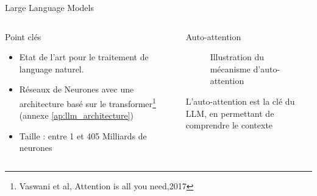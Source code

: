 
\begin{frame}{Large Language Models}
   \begin{columns}
         
       \begin{column}[t]{0.45\textwidth} 
       \begin{block}{Point clés}
           \begin{itemize}
               \item Etat de l'art pour le traitement de language naturel.
               \item Réseaux de Neurones avec une architecture basé sur le  transformer\footnote{Vaswani et al, Attention is all you need,2017 } (annexe \ref{ap:llm_architecture})
               \item Taille : entre 1 et 405 Milliards de neurones
           \end{itemize}
               
       \end{block}
       \end{column}
           
       \begin{column}[t]{0.5\textwidth}
       \begin{block}{Auto-attention}
           \begin{figure}
               \centering
               
               \caption{Illustration du mécanisme d'auto-attention}
           \end{figure}    
           L'auto-attention est la clé du LLM, en permettant de comprendre le contexte
       \end{block}  
       \end{column}
            
   \end{columns}
   \end{frame}


